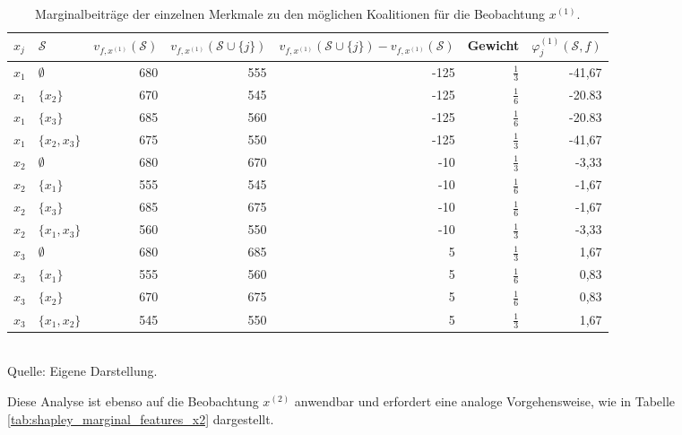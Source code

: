 \begin{table}[!h]
    \caption{Marginalbeiträge der einzelnen Merkmale zu den möglichen Koalitionen für die Beobachtung $x^{(1)}$.}
    \footnotesize
    \begin{tabularx}{\textwidth}{XXrrrrr}
    \toprule
    $x_{j}$ & $\mathcal{S}$ & $v_{f, x^{(1)}}(\mathcal{S})$ & $v_{f, x^{(1)}}(\mathcal{S} \cup \{j\})$ & $v_{f, x^{(1)}}(\mathcal{S} \cup \{j\}) - v_{f, x^{(1)}}(\mathcal{S})$ & Gewicht & $\varphi_{j}^{(1)}(\mathcal{S}, f)$\\
    \midrule
    $x_1$ & $\emptyset$ & 680 & 555 & -125 & $\frac{1}{3}$ & -41,67 \\
    $x_1$ & $\{x_2\}$ & 670 & 545 & -125 & $\frac{1}{6}$ & -20.83 \\
    $x_1$ & $\{x_3\}$ & 685 & 560 & -125 & $\frac{1}{6}$ & -20.83 \\
    $x_1$ & $\{x_2, x_3\}$ & 675 & 550 & -125 & $\frac{1}{3}$ & -41,67 \\
    $x_2$ & $\emptyset$ & 680 & 670 & -10 & $\frac{1}{3}$ & -3,33 \\
    $x_2$ & $\{x_1\}$ & 555 & 545 & -10 & $\frac{1}{6}$ & -1,67 \\
    $x_2$ & $\{x_3\}$ & 685 & 675 & -10 & $\frac{1}{6}$ & -1,67 \\
    $x_2$ & $\{x_1, x_3\}$ & 560 & 550 & -10 & $\frac{1}{3}$ & -3,33 \\
    $x_3$ & $\emptyset$ & 680 & 685 & 5 & $\frac{1}{3}$ & 1,67 \\
    $x_3$ & $\{x_1\}$ & 555 & 560 & 5 & $\frac{1}{6}$ & 0,83 \\
    $x_3$ & $\{x_2\}$ & 670 & 675 & 5 & $\frac{1}{6}$ & 0,83 \\
    $x_3$ & $\{x_1, x_2\}$ & 545 & 550 & 5 & $\frac{1}{3}$ & 1,67 \\
    \bottomrule
    \end{tabularx}
    \label{tab:shapley_marginal_features_x1}
    \normalsize\\
    Quelle: Eigene Darstellung.
\end{table}

Diese Analyse ist ebenso auf die Beobachtung $x^{(2)}$ anwendbar und erfordert eine analoge Vorgehensweise, 
wie in Tabelle \ref{tab:shapley_marginal_features_x2} dargestellt.

